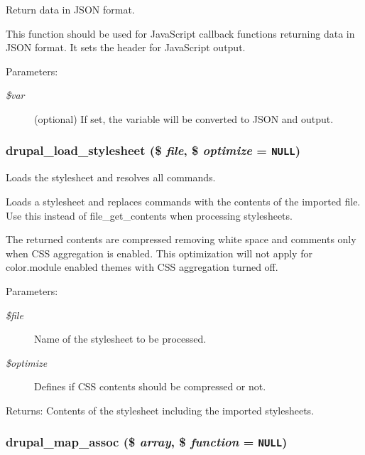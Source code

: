 Return data in JSON format.

This function should be used for JavaScript callback functions returning data in JSON format. It sets the header for JavaScript output.

\begin{Desc}
\item[Parameters:]
\begin{description}
\item[{\em \$var}](optional) If set, the variable will be converted to JSON and output. \end{description}
\end{Desc}
\hypertarget{common_8inc_f20aa4e55e7003eaff27f5c6078a4ae0}{
\subsubsection[{drupal\_\-load\_\-stylesheet}]{\setlength{\rightskip}{0pt plus 5cm}drupal\_\-load\_\-stylesheet (\$ {\em file}, \/  \$ {\em optimize} = {\tt NULL})}}
\label{common_8inc_f20aa4e55e7003eaff27f5c6078a4ae0}


Loads the stylesheet and resolves all  commands.

Loads a stylesheet and replaces  commands with the contents of the imported file. Use this instead of file\_\-get\_\-contents when processing stylesheets.

The returned contents are compressed removing white space and comments only when CSS aggregation is enabled. This optimization will not apply for color.module enabled themes with CSS aggregation turned off.

\begin{Desc}
\item[Parameters:]
\begin{description}
\item[{\em \$file}]Name of the stylesheet to be processed. \item[{\em \$optimize}]Defines if CSS contents should be compressed or not. \end{description}
\end{Desc}
\begin{Desc}
\item[Returns:]Contents of the stylesheet including the imported stylesheets. \end{Desc}
\hypertarget{common_8inc_72b55fe42aa726cc506660138abd3307}{
\subsubsection[{drupal\_\-map\_\-assoc}]{\setlength{\rightskip}{0pt plus 5cm}drupal\_\-map\_\-assoc (\$ {\em array}, \/  \$ {\em function} = {\tt NULL})}}
\label{common_8inc_72b55fe42aa726cc506660138abd3307}


